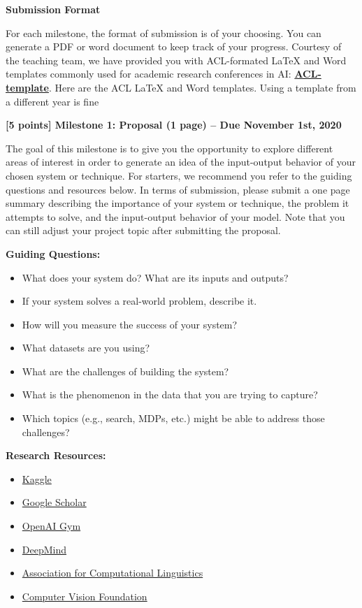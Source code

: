 \large
\textbf{Submission Format}\vspace{\baselineskip}

\normalsize
For each milestone, the format of submission is of your choosing. You can generate a PDF or word document to keep track of your progress. Courtesy of the teaching team, we have provided you with ACL-formated LaTeX and Word templates commonly used for academic research conferences in AI: \textbf{\href{http://acl2020.org/downloads/acl2020-templates.zip}{ACL-template}}. Here are the ACL LaTeX and Word templates. Using a template from a different year is fine

\clearpage

\large
\textbf{[5 points] Milestone 1: Proposal (1 page) -- Due November 1st, 2020}


\normalsize
The goal of this milestone is to give you the opportunity to explore different areas of interest in order to generate an idea of the input-output behavior of your chosen system or technique. For starters, we recommend you refer to the guiding questions and resources below. In terms of submission, please submit a one page summary describing the importance of your system or technique, the problem it attempts to solve, and the input-output behavior of your model. Note that you can still adjust your project topic after submitting the proposal. \vspace{\baselineskip}

\textbf{Guiding Questions: }
\begin{itemize}
    \item What does your system do? What are its inputs and outputs?
    \item If your system solves a real-world problem, describe it.
    \item How will you measure the success of your system?
    \item What datasets are you using?
    \item What are the challenges of building the system?
    \item What is the phenomenon in the data that you are trying to capture?
    \item Which topics (e.g., search, MDPs, etc.) might be able to address those challenges?
\end{itemize}
\vspace{\baselineskip}

\textbf{Research Resources: }
\begin{itemize}
    \item \href{https://www.kaggle.com/datasets}{Kaggle}
    \item \href{https://scholar.google.com/}{Google Scholar}
    \item \href{https://gym.openai.com/}{OpenAI Gym}
    \item \href{https://deepmind.com/}{DeepMind}
    \item \href{https://www.mitpressjournals.org/loi/coli}{Association for Computational Linguistics}
    \item \href{https://openaccess.thecvf.com/menu}{Computer Vision Foundation}
\end{itemize}

